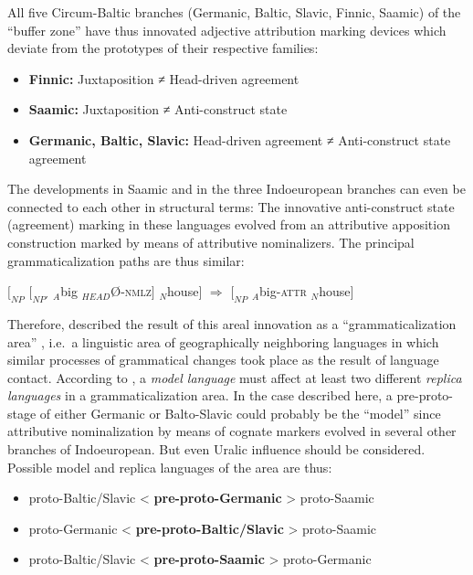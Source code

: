 All five Circum-Baltic branches (Germanic, Baltic, Slavic, Finnic, Saamic) of the “buffer zone” have thus innovated adjective attribution marking devices which deviate from the prototypes of their respective families:
\begin{itemize}
\item	\textbf{Finnic:}
\subitem Juxtaposition ≠ Head-driven agreement
\item	\textbf{Saamic:}
\subitem Juxtaposition ≠ Anti-construct state
\item	\textbf{Germanic, Baltic, Slavic:}
\subitem Head-driven agreement ≠ Anti-construct state agreement
\end{itemize}
The developments in Saamic and in the three Indoeuropean branches can even be connected to each other in structural terms: The innovative anti-construct state (agreement) marking in these languages evolved from an attributive apposition construction marked by means of attributive nominalizers. The principal grammaticalization paths are thus similar:
\begin{exe}
\ex $[_{NP}$ $[_{NP'}$ $_{A}$big $_{HEAD}$Ø-\textsc{nmlz}$]$ $_{N}$house$]$ $\Rightarrow$ $[_{NP}$ $_{A}$big-\textsc{attr} $_{N}$house$]$
\end{exe}
Therefore, \citet[271]{riesler2006a} described the result of this areal innovation as a “grammaticalization area” \citep{heine-etal2005}, i.e.~a linguistic area of geographically neighboring languages in which similar processes of grammatical changes took place as the result of language contact. According to \citet{heine-etal2005}, a \textit{model language} must affect at least two different \textit{replica languages} in a grammaticalization area. In the case described here, a pre-proto-stage of either Germanic or Balto-Slavic could probably be the “model” since attributive nominalization by means of cognate markers evolved in several other branches of Indoeuropean. But even Uralic influence should be considered. Possible model and replica languages of the area are thus:
\begin{itemize}
\item	\begin{center}proto-Baltic/Slavic < \textbf{pre-proto-Germanic} > proto-Saamic\end{center}
\item	\begin{center}proto-Germanic < \textbf{pre-proto-Baltic/Slavic} > proto-Saamic\end{center}
\item \begin{center}proto-Baltic/Slavic < \textbf{pre-proto-Saamic} > proto-Germanic\end{center}
\end{itemize}
